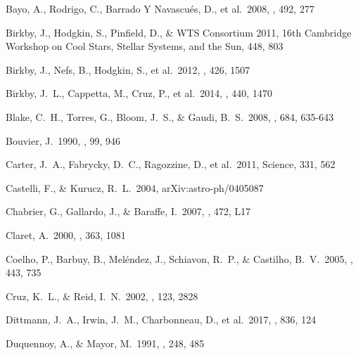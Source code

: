 \documentclass[fleqn,usenatbib]{mnras}
\begin{document}
\begin{thebibliography}{99}
 Bayo, A., Rodrigo, C., Barrado Y Navascu{\'e}s, D., et al.\ 2008, \aap, 492, 277 

 Birkby, J., Hodgkin, S., Pinfield, D., \& WTS Consortium 2011, 16th Cambridge Workshop on Cool Stars, Stellar Systems, and the Sun, 448, 803 

 Birkby, J., Nefs, B., Hodgkin, S., et al.\ 2012, \mnras, 426, 1507 

 Birkby, J.~L., Cappetta, M., Cruz, P., et al.\ 2014, \mnras, 440, 1470 

 Blake, C.~H., Torres, G., Bloom, J.~S., \& Gaudi, B.~S.\ 2008, \apj, 684, 635-643 

 Bouvier, J.\ 1990, \aj, 99, 946 

 Carter, J.~A., Fabrycky, D.~C., Ragozzine, D., et al.\ 2011, Science, 331, 562 

 Castelli, F., \& Kurucz, R.~L.\ 2004, arXiv:astro-ph/0405087 

 Chabrier, G., Gallardo, J., \& Baraffe, I.\ 2007, \aap, 472, L17 

 Claret, A.\ 2000, \aap, 363, 1081 

 Coelho, P., Barbuy, B., Mel{\'e}ndez, J., Schiavon, R.~P., \& Castilho, B.~V.\ 2005, \aap, 443, 735 

 Cruz, K.~L., \& Reid, I.~N.\ 2002, \aj, 123, 2828 

 Dittmann, J.~A., Irwin, J.~M., Charbonneau, D., et al.\ 2017, \apj, 836, 124 


 Duquennoy, A., \& Mayor, M.\ 1991, \aap, 248, 485 


\end{thebibliography}
\end{document}
